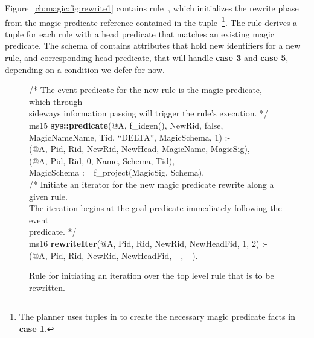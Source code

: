 Figure~\ref{ch:magic:fig:rewrite1} contains rule~, which initializes
the rewrite phase from the magic predicate reference contained in the
 tuple~\footnote{The planner uses tuples in
 to create the necessary magic predicate facts in {\bf case
1}.}.  The rule derives a  tuple for each rule with a head
predicate that matches an existing magic predicate.  The schema of
 contains attributes that hold new identifiers for a new
rule, and corresponding head predicate, that will handle {\bf case 3} and
{\bf case 5}, depending on a condition we defer for now.

\begin{figure}[!t]
\ssp
\centering
\begin{boxedminipage}{\linewidth}
/* The event predicate for the new rule is the magic predicate, which through \\
sideways information passing will trigger the rule's execution. */ \\ 
ms15 {\bf sys::predicate}(@A, f\_idgen(), NewRid, false, MagicNameName, Tid, ``DELTA'', MagicSchema, 1) :- \\
(@A, Pid, Rid, NewRid, NewHead, MagicName, MagicSig), \\
(@A, Pid, Rid, 0, Name, Schema, Tid), \\
\datalogspace MagicSchema := f\_project(MagicSig, Schema).\\

/* Initiate an iterator for the new magic predicate rewrite along a given rule.  \\
The iteration begins at the goal predicate immediately following the event \\
predicate. */ \\
ms16 {\bf rewriteIter}(@A, Pid, Rid, NewRid, NewHeadFid, 1, 2) :- \\
(@A, Pid, Rid, NewRid, NewHeadFid, \_, \_). \\

\end{boxedminipage}
\caption{\label{ch:magic:fig:rewrite2} Rule for initiating an iteration over the
top level rule that is to be rewritten. }
\end{figure}

